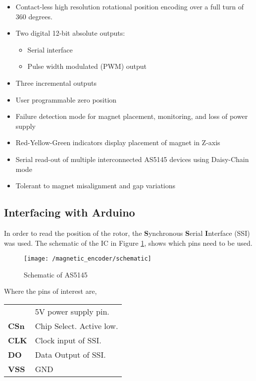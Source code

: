 \begin{itemize}
	\item Contact-less high resolution rotational position encoding over a full turn of 360 degrees.
	\item Two digital 12-bit absolute outputs:
	\begin{itemize}
		\item Serial interface
		\item Pulse width modulated (PWM) output
	\end{itemize}
	\item Three incremental outputs
	\item User programmable zero position
	\item Failure detection mode for magnet placement, monitoring, and loss of power supply
	\item Red-Yellow-Green indicators display placement of magnet in Z-axis
	\item Serial read-out of multiple interconnected AS5145 devices using Daisy-Chain mode
	\item Tolerant to magnet misalignment and gap variations
\end{itemize}


\newpage
\subsection{Interfacing with Arduino} \label{subsec:sensor-arduino}

In order to read the position of the rotor, the \textbf{S}ynchronous \textbf{S}erial \textbf{I}nterface (SSI) was used. The schematic of the IC in Figure \ref{Fig:Schematic}, shows which pins need to be used.

\begin{figure}[h]
	\begin{center}
		\texttt{[image: /magnetic\_encoder/schematic]}
		\caption{Schematic of AS5145}
		\label{Fig:Schematic}
	\end{center}
\end{figure}

\noindent Where the pins of interest are,

\begin{center}
	\begin{tabular}{|l l|}
	\hline \boldmath{$VDD5V$} 	& 5V power supply pin.\\
	\textbf{CSn}			& Chip Select. Active low.\\
	\textbf{CLK}			& Clock input of SSI.\\
	\textbf{DO}			& Data Output of SSI.\\	
	\textbf{VSS}			& GND	\\	\hline
	\end{tabular}
\end{center}

